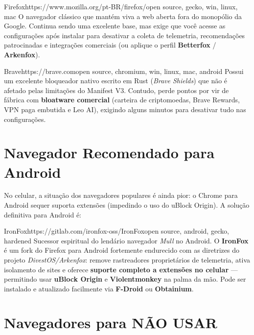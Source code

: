 \documentclass{pousadaguide}
\begin{document}
\begin{ferramenta}[logo=firefox]{Firefox}{https://www.mozilla.org/pt-BR/firefox/}{open source, gecko, win, linux, mac}
O navegador clássico que mantém viva a web aberta fora do monopólio da Google. Continua sendo uma excelente base, mas exige que você acesse as configurações após instalar para desativar a coleta de telemetria, recomendações patrocinadas e integrações comerciais (ou aplique o perfil \textbf{Betterfox} / \textbf{Arkenfox}). 
\end{ferramenta}

\begin{ferramenta}[logo=brave]{Brave}{https://brave.com}{open source, chromium, win, linux, mac, android}
Possui um excelente bloqueador nativo escrito em Rust (\emph{Brave Shields}) que não é afetado pelas limitações do Manifest V3. Contudo, perde pontos por vir de fábrica com \textbf{bloatware comercial} (carteira de criptomoedas, Brave Rewards, VPN paga embutida e Leo AI), exigindo alguns minutos para desativar tudo nas configurações. 
\end{ferramenta}

\section{Navegador Recomendado para Android}

No celular, a situação dos navegadores populares é ainda pior: o Chrome para Android sequer suporta extensões (impedindo o uso do uBlock Origin). A solução definitiva para Android é:

\begin{ferramenta}[goat,logo=ironfox]{IronFox}{https://gitlab.com/ironfox-oss/IronFox}{open source, android, gecko, hardened}
Sucessor espiritual do lendário navegador \emph{Mull} no Android. O \textbf{IronFox} é um fork do Firefox para Android fortemente endurecido com as diretrizes do projeto \emph{DivestOS/Arkenfox}: remove rastreadores proprietários de telemetria, ativa isolamento de sites e oferece \textbf{suporte completo a extensões no celular} — permitindo usar \textbf{uBlock Origin} e \textbf{Violentmonkey} na palma da mão. Pode ser instalado e atualizado facilmente via \textbf{F-Droid} ou \textbf{Obtainium}. 
\end{ferramenta}

\section{Navegadores para NÃO USAR}
\end{document}
